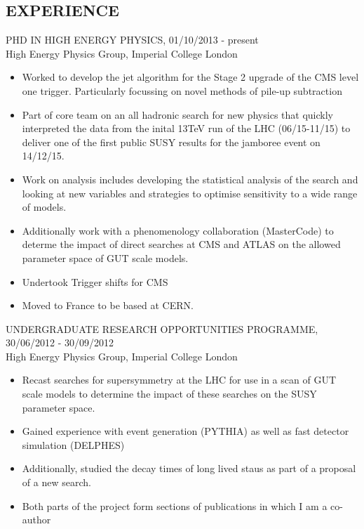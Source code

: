 \documentclass[9pt]{res} %
\begin{document}
\begin{resume}
\section{EXPERIENCE} 
\vspace{0.2cm}
PHD IN HIGH ENERGY PHYSICS, 01/10/2013 - present \\
\vspace{0.1cm}
High Energy Physics Group, Imperial College London 
   \begin{itemize} \itemsep -2pt  %
   \item Worked to develop the jet algorithm for the Stage 2 upgrade of the CMS level one trigger. Particularly focussing on novel methods of pile-up subtraction
   \item Part of core team on an all hadronic search for new physics that quickly interpreted the data from the inital 13TeV run of the LHC (06/15-11/15) to deliver one of the first public SUSY results for the jamboree event on 14/12/15. 
   \item Work on analysis includes developing the statistical analysis of the search and looking at new variables and strategies to optimise sensitivity to a wide range of models.
   \item Additionally work with a phenomenology collaboration (MasterCode) to determe the impact of direct searches at CMS and ATLAS on the allowed parameter space of GUT scale models.
   \item Undertook Trigger shifts for CMS
   \item Moved to France to be based at CERN. 
 \end{itemize}

UNDERGRADUATE RESEARCH OPPORTUNITIES PROGRAMME, 30/06/2012 - 30/09/2012 \\
\vspace{0.1cm}
High Energy Physics Group, Imperial College London
   \begin{itemize} \itemsep -2pt  %
   \item Recast searches for supersymmetry at the LHC for use in a scan of GUT scale models to determine the impact of these searches on the SUSY parameter space.
   \item Gained experience with event generation (PYTHIA) as well as fast detector simulation (DELPHES)
   \item Additionally, studied the decay times of long lived staus as part of a proposal of a new search.
   \item Both parts of the project form sections of publications in which I am a co-author
 \end{itemize}


\end{resume}
\end{document}
